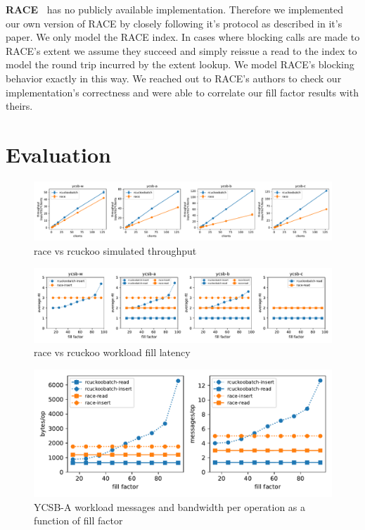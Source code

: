 \textbf{RACE~\cite{race}} has no publicly available
implementation. Therefore we implemented our own version of
RACE by closely following it's protocol as described in it's
paper.  We only model the RACE index. In cases where
blocking calls are made to RACE's extent we assume they
succeed and simply reissue a read to the index to model the
round trip incurred by the extent lookup. We model RACE's
blocking behavior exactly in this way. We reached out to
RACE's authors to check our implementation's correctness and
were able to correlate our fill factor results with theirs.

\section{Evaluation}
\label{sec:eval}

\begin{figure}[ht]
    \includegraphics[width=0.99\linewidth]{fig/hero_ycsb_throughput.pdf}
    \caption{race vs rcuckoo simulated throughput }
    \label{fig:ycsb_throughput}
\end{figure}

\begin{figure}[ht]
    \includegraphics[width=0.99\linewidth]{fig/hero_ycsb_fill_latency.pdf}
    \caption{race vs rcuckoo workload fill latency}
    \label{fig:ycsb_fill_latency}
\end{figure}

\begin{figure}[ht]
    \includegraphics[width=0.99\linewidth]{fig/hero_ycsb_fill_ops_bw.pdf}
    \caption{YCSB-A workload messages and bandwidth per operation as a function of fill factor}
    \label{fig:ycsb_fill_ops_bw}
\end{figure}

